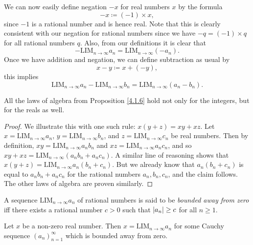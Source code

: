 \begin{note}
    We can now easily define negation \(-x\) for real numbers \(x\) by the formula
    \[
        -x \coloneqq (-1) \times x,
    \]
    since \(-1\) is a rational number and is hence real.
    Note that this is clearly consistent with our negation for rational numbers since we have \(-q = (-1) \times q\) for all rational numbers \(q\).
    Also, from our definitions it is clear that
    \[
        -\text{LIM}_{n \to \infty} a_n = \text{LIM}_{n \to \infty} (-a_n).
    \]
    Once we have addition and negation, we can define subtraction as usual by
    \[
        x - y \coloneqq x + (-y),
    \]
    this implies
    \[
        \text{LIM}_{n \to \infty} a_n - \text{LIM}_{n \to \infty} b_n = \text{LIM}_{n \to \infty} (a_n - b_n).
    \]
\end{note}

\begin{proposition}\label{5.3.11}
    All the laws of algebra from Proposition \ref{4.1.6} hold not only for the integers, but for the reals as well.
\end{proposition}

\begin{proof}
    We illustrate this with one such rule: \(x(y + z) = xy + xz\).
    Let \(x = \text{LIM}_{n \to \infty} a_n\), \(y = \text{LIM}_{n \to \infty} b_n\), and \(z = \text{LIM}_{n \to \infty} c_n\) be real numbers.
    Then by definition, \(xy = \text{LIM}_{n \to \infty} a_n b_n\) and \(xz = \text{LIM}_{n \to \infty} a_n c_n\), and so \(xy + xz = \text{LIM}_{n \to \infty} (a_n b_n + a_n c_n)\).
    A similar line of reasoning shows that \(x(y + z) = \text{LIM}_{n \to \infty} a_n (b_n + c_n)\).
    But we already know that \(a_n (b_n + c_n)\) is equal to \(a_n b_n + a_n c_n\) for the rational numbers \(a_n, b_n, c_n\), and the claim follows.
    The other laws of algebra are proven similarly.
\end{proof}

\begin{definition}\label{5.3.12}
    A sequence \(\text{LIM}_{n \to \infty} a_n\) of rational numbers is said to be \emph{bounded away from zero} iff there exists a rational number \(c > 0\) such that \(\abs*{a_n} \geq c\) for all \(n \geq 1\).
\end{definition}

\setcounter{theorem}{13}
\begin{lemma}\label{5.3.14}
    Let \(x\) be a non-zero real number.
    Then \(x = \text{LIM}_{n \to \infty} a_n\) for some Cauchy sequence \((a_n)_{n = 1}^{\infty}\) which is bounded away from zero.
\end{lemma}

